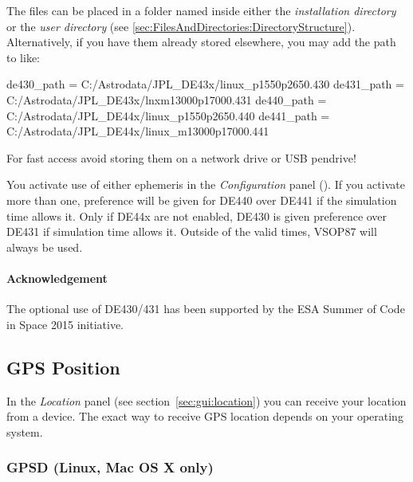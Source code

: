 The files can be placed in a folder named  inside either
the \emph{installation directory} or the \emph{user directory}
(see \ref{sec:FilesAndDirectories:DirectoryStructure}). Alternatively,
if you have them already stored elsewhere, you may add the path to
 like:
\begin{configfile}
[astro]
de430_path = C:/Astrodata/JPL_DE43x/linux_p1550p2650.430
de431_path = C:/Astrodata/JPL_DE43x/lnxm13000p17000.431
de440_path = C:/Astrodata/JPL_DE44x/linux_p1550p2650.440
de441_path = C:/Astrodata/JPL_DE44x/linux_m13000p17000.441
\end{configfile}

For fast access avoid storing them on a network drive or USB pendrive!

You activate use of either ephemeris in the \emph{Configuration} panel
(). If you activate more than one, preference will be given
for DE440 over DE441 if the simulation time allows it. Only if DE44x
are not enabled, DE430 is given preference over DE431 if simulation
time allows it.  Outside of the valid times, VSOP87 will always be
used.

\paragraph{Acknowledgement}
The optional use of DE430/431 has been supported by the ESA Summer of
Code in Space 2015 initiative.

\subsection{GPS Position}
\label{sec:ExtraData:GPS}

\noindent In the \emph{Location} panel (see
section~\ref{sec:gui:location}) you can receive your location from a
 device.   The exact way to receive
GPS location depends on your operating system. 

\subsubsection{GPSD (Linux, Mac OS X only)}
\label{sec:ExtraData:GPS:GPSD}

